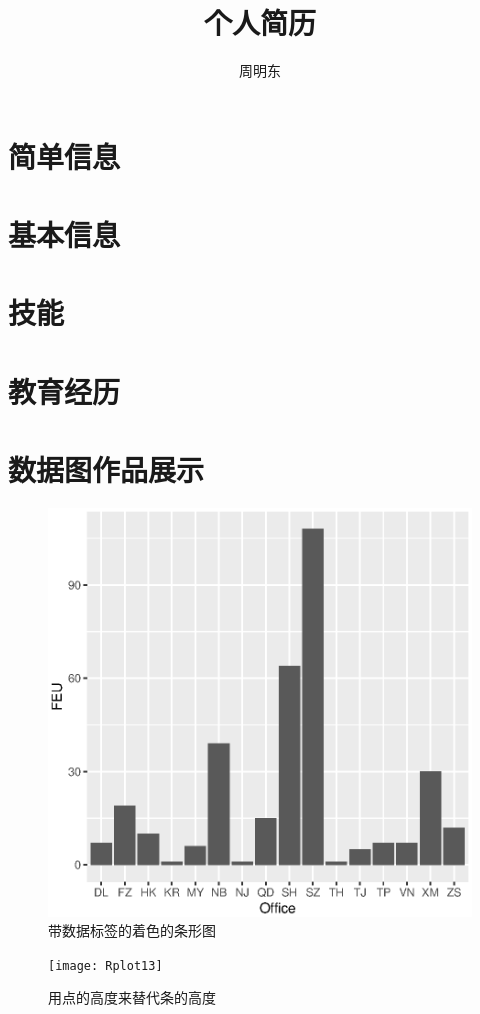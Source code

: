 \documentclass[a4paper]{book}
\title{个人简历}
\author{周明东}
\begin{document}
	\frontmatter
	\maketitle
	\tableofcontents

	\mainmatter
	\section{简单信息}
		
	\section{基本信息}
		
	\section{技能}
		
	\section{教育经历}
		
	\section{数据图作品展示}
		\begin{figure}
		\begin{center}
		\includegraphics{Rplot01}
		\caption{带数据标签的着色的条形图}
		\end{center}
		\end{figure}
		\begin{figure}
		\begin{center}
		\texttt{[image: Rplot13]}
		\caption{用点的高度来替代条的高度}
		\end{center}
		\end{figure}
\end{document}
